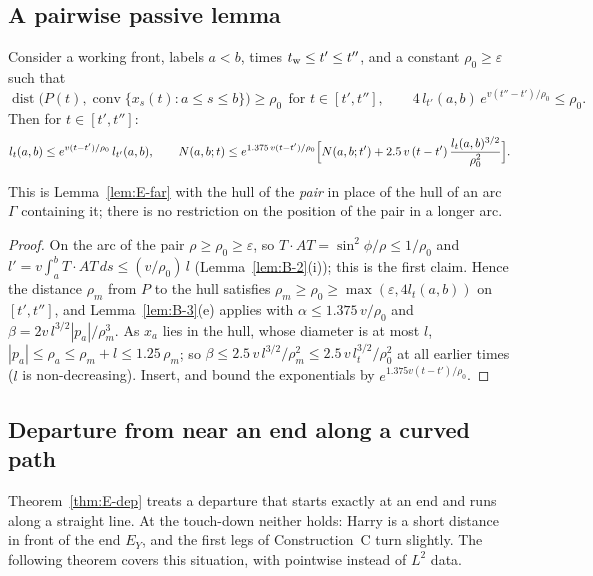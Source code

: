 \subsection{A pairwise passive lemma}

\begin{lemma}\label{lem:T2-A}
Consider a working front, labels $a<b$, times $t_{\mathrm w}\le t'\le t''$, and a constant $\rho_0\ge\varepsilon$ such that
\[
\operatorname{dist}\bigl(P(t),\operatorname{conv}\{x_s(t):a\le s\le b\}\bigr)\ge\rho_0\ \ \text{for }t\in[t',t''],\qquad
4\,l_{t'}(a,b)\,e^{v(t''-t')/\rho_0}\le\rho_0 .
\]
Then for $t\in[t',t'']$:
\[
l_t(a,b)\le e^{v(t-t')/\rho_0}\,l_{t'}(a,b),\qquad
N(a,b;t)\le e^{1.375\,v(t-t')/\rho_0}\Bigl[N(a,b;t')+2.5\,v\,(t-t')\,\frac{l_t(a,b)^{3/2}}{\rho_0^2}\Bigr].
\]
\end{lemma}
This is Lemma~\ref{lem:E-far} with the hull of the \emph{pair} in place of the hull of an arc $\Gamma$ containing it; there is no
restriction on the position of the pair in a longer arc.
\begin{proof}
On the arc of the pair $\rho\ge\rho_0\ge\varepsilon$, so $T\cdot AT=\sin^2\!\phi/\rho\le1/\rho_0$ and
$l'=v\int_a^bT\cdot AT\,ds\le(v/\rho_0)\,l$ (Lemma~\ref{lem:B-2}(i)); this is the first claim. Hence the distance $\rho_m$ from $P$
to the hull satisfies $\rho_m\ge\rho_0\ge\max(\varepsilon,4l_t(a,b))$ on $[t',t'']$, and Lemma~\ref{lem:B-3}(e) applies with
$\alpha\le1.375\,v/\rho_0$ and $\beta=2v\,l^{3/2}|p_a|/\rho_m^3$. As $x_a$ lies in the hull, whose diameter is at most $l$,
$|p_a|\le\rho_a\le\rho_m+l\le1.25\,\rho_m$; so $\beta\le2.5\,v\,l^{3/2}/\rho_m^2\le2.5\,v\,l_t^{3/2}/\rho_0^2$ at all earlier times
($l$ is non-decreasing). Insert, and bound the exponentials by $e^{1.375v(t-t')/\rho_0}$.
\end{proof}

\subsection{Departure from near an end along a curved path}

Theorem~\ref{thm:E-dep} treats a departure that starts exactly at an end and runs along a straight line. At the touch-down
neither holds: Harry is a short distance in front of the end $E_Y$, and the first legs of Construction~C turn slightly. The
following theorem covers this situation, with pointwise instead of $L^2$ data.

